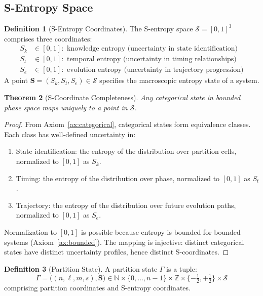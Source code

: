 \documentclass[10pt,twocolumn]{article}
\theoremstyle{plain}
\newtheorem{theorem}{Theorem}[section]
\theoremstyle{definition}
\newtheorem{definition}[theorem]{Definition}
\theoremstyle{remark}
\newcommand{\N}{\mathbb{N}}
\newcommand{\Z}{\mathbb{Z}}
\newcommand{\Sspace}{\mathcal{S}}
\newcommand{\Sk}{S_k}
\newcommand{\St}{S_t}
\newcommand{\Se}{S_e}
\newcommand{\Scoord}{\mathbf{S}}
\newcommand{\Gstate}{\Gamma}
\begin{document}
\subsection{S-Entropy Space}

\begin{definition}[S-Entropy Coordinates]
\label{def:s_entropy}
The S-entropy space $\Sspace = [0,1]^3$ comprises three coordinates:
\begin{align}
\Sk &\in [0,1]: \text{ knowledge entropy (uncertainty in state identification)} \\
\St &\in [0,1]: \text{ temporal entropy (uncertainty in timing relationships)} \\
\Se &\in [0,1]: \text{ evolution entropy (uncertainty in trajectory progression)}
\end{align}
A point $\Scoord = (\Sk, \St, \Se) \in \Sspace$ specifies the macroscopic entropy state of a system.
\end{definition}

\begin{theorem}[S-Coordinate Completeness]
\label{thm:s_complete}
Any categorical state in bounded phase space maps uniquely to a point in $\Sspace$.
\end{theorem}

\begin{proof}
From Axiom~\ref{ax:categorical}, categorical states form equivalence classes. Each class has well-defined uncertainty in:
\begin{enumerate}[label=(\roman*)]
\item State identification: the entropy of the distribution over partition cells, normalized to $[0,1]$ as $\Sk$.
\item Timing: the entropy of the distribution over phase, normalized to $[0,1]$ as $\St$.
\item Trajectory: the entropy of the distribution over future evolution paths, normalized to $[0,1]$ as $\Se$.
\end{enumerate}
Normalization to $[0,1]$ is possible because entropy is bounded for bounded systems (Axiom~\ref{ax:bounded}). The mapping is injective: distinct categorical states have distinct uncertainty profiles, hence distinct S-coordinates.
\end{proof}

\begin{definition}[Partition State]
\label{def:partition_state}
A partition state $\Gstate$ is a tuple:
\begin{equation}
\Gstate = \bigl((n, \ell, m, s), \Scoord\bigr) \in \N \times \{0,\ldots,n-1\} \times \Z \times \{-\tfrac{1}{2}, +\tfrac{1}{2}\} \times \Sspace
\end{equation}
comprising partition coordinates and S-entropy coordinates.
\end{definition}
\end{document}
